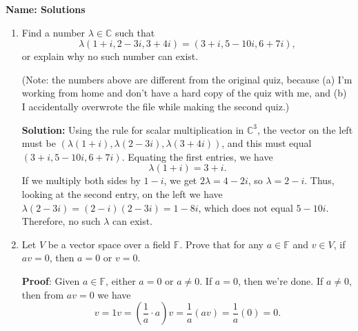 \documentclass[12pt]{article}
\newcommand{\C}{\mathbb{C}}
\begin{document}
\thispagestyle{fancy}
{\bf Name: Solutions}
 \begin{enumerate}
 \item  Find a number $\lambda\in\C$ such that
 \[
 \lambda(1+i,2-3i,3+4i) = (3+i,5-10i,6+7i),
 \]
 or explain why no such number can exist.
 
 \bigskip
 
 (Note: the numbers above are different from the original quiz, because (a) I'm working from home and don't have a hard copy of the quiz with me, and (b) I accidentally overwrote the file while making the second quiz.)
 
 {\bf Solution:} Using the rule for scalar multiplication in $\C^3$, the vector on the left must be $(\lambda(1+i),\lambda(2-3i),\lambda(3+4i))$, and this must equal $(3+i,5-10i,6+7i)$. Equating the first entries, we have
 \[
 \lambda(1+i) = 3+i.
 \]
 If we multiply both sides by $1-i$, we get $2\lambda = 4-2i$, so $\lambda = 2-i$. Thus, looking at the second entry, on the left we have $\lambda(2-3i) = (2-i)(2-3i) = 1-8i$, which does not equal $5-10i$. Therefore, no such $\lambda$ can exist.
 
 \bigskip
 
 \item Let $V$ be a vector space over a field $\mathbb{F}$. Prove that for any $a\in \mathbb{F}$ and $v\in V$, if $av=0$, then $a=0$ or $v=0$.
 
 \bigskip
 
 {\bf Proof}: Given $a\in\mathbb{F}$, either $a=0$ or $a\neq 0$. If $a=0$, then we're done. If $a\neq 0$, then from $av=0$ we have
 \[
 v = 1v = \left(\frac{1}{a}\cdot a\right)v = \frac{1}{a}(av) = \frac{1}{a}(0) = 0.
 \]
 \end{enumerate}
\end{document}
